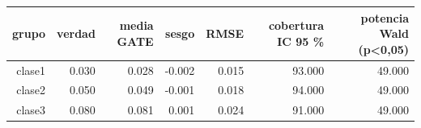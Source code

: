 \begin{tabular}{rrrrrrr}
\toprule
grupo & verdad & media GATE & sesgo & RMSE & cobertura IC 95 \% & potencia Wald (p<0,05) \\
\midrule
clase1 & 0.030 & 0.028 & -0.002 & 0.015 & 93.000 & 49.000 \\
clase2 & 0.050 & 0.049 & -0.001 & 0.018 & 94.000 & 49.000 \\
clase3 & 0.080 & 0.081 & 0.001 & 0.024 & 91.000 & 49.000 \\
\bottomrule
\end{tabular}